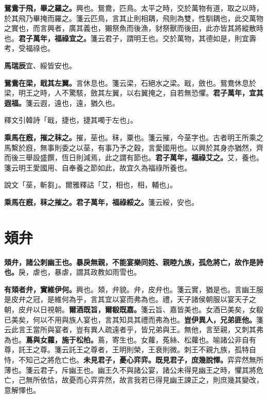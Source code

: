 \textbf{鴛鴦于飛，畢之羅之。}{\footnotesize 興也。鴛鴦，匹鳥。太平之時，交於萬物有道，取之以時，於其飛乃畢掩而羅之。箋云匹鳥，言其止則相耦，飛則為雙，性馴耦也，此交萬物之實也，而言興者，廣其義也，獺祭魚而後漁，豺祭獸而後田，此亦皆其將縱散時也。}\textbf{君子萬年，福祿宜之。}{\footnotesize 箋云君子，謂明王也。交於萬物，其德如是，則宜壽考，受福祿也。}

\begin{quoting}\textbf{馬瑞辰}宜、綏皆安也。\end{quoting}

\textbf{鴛鴦在梁，戢其左翼。}{\footnotesize 言休息也。箋云梁，石絕水之梁。戢，斂也。鴛鴦休息於梁，明王之時，人不驚駭，斂其左翼，以右翼掩之，自若無恐懼。}\textbf{君子萬年，宜其遐福。}{\footnotesize 箋云遐，遠也，遠，猶久也。}

\begin{quoting}釋文引韓詩「戢，捷也，捷其噣于左也」。\end{quoting}

\textbf{乘馬在廐，摧之秣之。}{\footnotesize 摧，莝也。秣，粟也。箋云摧，今莝字也。古者明王所乘之馬繫於廐，無事則委之以莝，有事乃予之穀，言愛國用也。以興於其身亦猶然，齊而後三舉設盛饌，恆日則減焉，此之謂有節也。}\textbf{君子萬年，福祿艾之。}{\footnotesize 艾，養也。箋云明王愛國用、自奉養之節如此，故宜久為福祿所養也。}

\begin{quoting}說文「莝，斬芻」。爾雅釋詁「艾，相也，相，輔也」。\end{quoting}

\textbf{乘馬在廐，秣之摧之。君子萬年，福祿綏之。}{\footnotesize 箋云綏，安也。}

\section{頍弁}


\textbf{頍弁，諸公刺幽王也。暴戾無親，不能宴樂同姓、親睦九族，孤危將亡，故作是詩也。}{\footnotesize 戾，虐也，暴虐，謂其政教如雨雪也。}

\textbf{有頍者弁，實維伊何。}{\footnotesize 興也。頍，弁貌。弁，皮弁也。箋云實，猶是也。言幽王服是皮弁之冠，是維何為乎，言其宜以宴而弗為也。禮，天子諸侯朝服以宴天子之朝，皮弁以日視朝。}\textbf{爾酒既旨，爾殽既嘉。}{\footnotesize 箋云旨、嘉皆美也。女酒已美矣，女殽已美矣，何以不用與族人宴也，言其知具其禮而弗為也。}\textbf{豈伊異人，兄弟匪他。}{\footnotesize 箋云此言王當所與宴者，豈有異人疏遠者乎，皆兄弟與王。無他，言至親，又刺其弗為也。}\textbf{蔦與女蘿，施于松柏。}{\footnotesize 蔦，寄生也。女蘿，菟絲、松蘿也。喻諸公非自有尊，託王之尊。箋云託王之尊者，王明則榮，王衰則微。刺王不親九族，孤特自恃，不知己之將危亡也。}\textbf{未見君子，憂心弈弈。既見君子，庶幾說懌。}{\footnotesize 弈弈然無所薄也。箋云君子，斥幽王也。幽王久不與諸公宴，諸公未得見幽王之時，懼其將危亡，己無所依怙，故憂而心弈弈然，故言我若已得見幽王諫正之，則庶幾其變改，意解懌也。}

